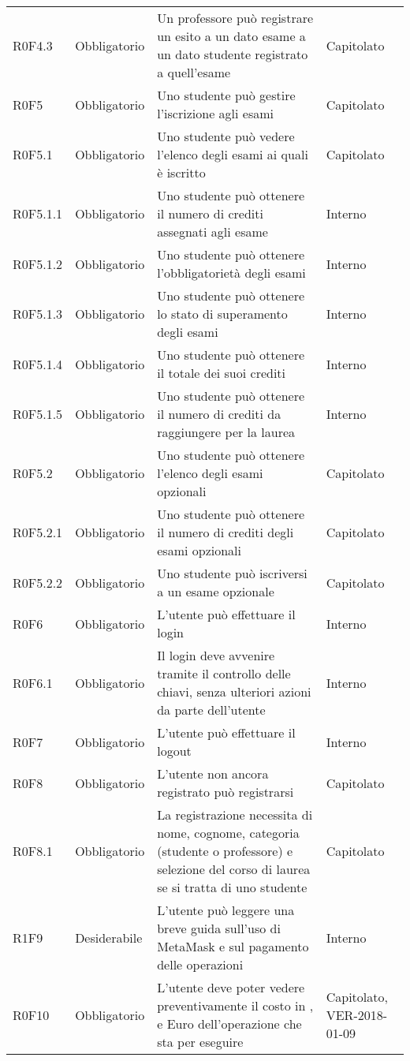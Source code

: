 \documentclass[AnalisiDeiRequisiti.tex]{subfiles}
\begin{document}
\begin{longtable}[H]{p{2.6cm}p{2.5cm}p{5cm}p{2cm}}
	R0F4.3 & Obbligatorio & Un professore può registrare un esito a un dato esame a un dato studente registrato a quell'esame & Capitolato \\
	R0F5 & Obbligatorio & Uno studente può gestire l'iscrizione agli esami & Capitolato \\
	R0F5.1 & Obbligatorio & Uno studente può vedere l'elenco degli esami ai quali è iscritto & Capitolato \\
	R0F5.1.1 & Obbligatorio & Uno studente può ottenere il numero di crediti assegnati agli esame & Interno \\
	R0F5.1.2 & Obbligatorio & Uno studente può ottenere l'obbligatorietà degli esami & Interno \\
	R0F5.1.3 & Obbligatorio & Uno studente può ottenere lo stato di superamento degli esami & Interno \\
	R0F5.1.4 & Obbligatorio & Uno studente può ottenere il totale dei suoi crediti & Interno \\
	R0F5.1.5 & Obbligatorio & Uno studente può ottenere il numero di crediti da raggiungere per la laurea & Interno \\
	R0F5.2 & Obbligatorio & Uno studente può ottenere l'elenco degli esami opzionali & Capitolato \\
	R0F5.2.1 & Obbligatorio & Uno studente può ottenere il numero di crediti degli esami opzionali & Capitolato \\
	R0F5.2.2 & Obbligatorio & Uno studente può iscriversi a un esame opzionale & Capitolato \\
	R0F6 & Obbligatorio & L'utente può effettuare il login & Interno \\
	R0F6.1 & Obbligatorio & Il login deve avvenire tramite il controllo delle chiavi, senza ulteriori azioni da parte dell'utente & Interno \\
	R0F7 & Obbligatorio & L'utente può effettuare il logout & Interno \\
	R0F8 & Obbligatorio & L'utente non ancora registrato può registrarsi & Capitolato \\
	R0F8.1 & Obbligatorio & La registrazione necessita di nome, cognome, categoria (studente o professore) e selezione del corso di laurea se si tratta di uno studente & Capitolato \\
	R1F9 & Desiderabile & L'utente può leggere una breve guida sull'uso di MetaMask e sul pagamento delle operazioni & Interno \\	
	R0F10 & Obbligatorio & L'utente deve poter vedere preventivamente il costo in \citGloss{Gas}, \citGloss{Ether} e Euro dell'operazione che sta per eseguire & Capitolato, VER-2018-01-09 \\	

\end{longtable}
\end{document}
